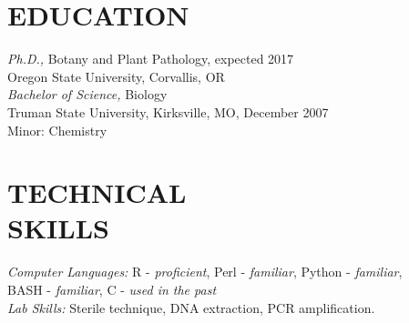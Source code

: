 \documentclass[margin, 10pt]{res} %
\begin{document}
\begin{resume}

 



\section{EDUCATION}

{\sl Ph.D.,} Botany and Plant Pathology, expected 2017 \\
Oregon State University, Corvallis, OR \\\newline
{\sl Bachelor of Science,} Biology \\
Truman State University, Kirksville, MO, December 2007 \\
Minor: Chemistry
 

\section{TECHNICAL \\ SKILLS} 

{\sl Computer Languages:} 
R - \textsl{proficient}, Perl - \textsl{familiar}, Python - \textsl{familiar}, \\BASH - \textsl{familiar}, C - \textsl{used in the past}\\\newline
{\sl Lab Skills:} Sterile technique, DNA extraction, PCR amplification. 
 

\end{resume}
\end{document}
